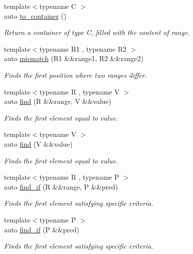 \begin{DoxyCompactItemize}
{\footnotesize template$<$typename C $>$ }\\auto \mbox{\hyperlink{namespacerah_aac33763a1f49060e179c2c2053ec07a2}{to\+\_\+container}} ()
\begin{DoxyCompactList}\small\item\em Return a container of type C, filled with the content of range. \end{DoxyCompactList}\item 
{\footnotesize template$<$typename R1 , typename R2 $>$ }\\auto \mbox{\hyperlink{namespacerah_a5ce2d92c6f0b3dd5eb6d70600e949a97}{mismatch}} (R1 \&\&range1, R2 \&\&range2)
\begin{DoxyCompactList}\small\item\em Finds the first position where two ranges differ. \end{DoxyCompactList}\item 
{\footnotesize template$<$typename R , typename V $>$ }\\auto \mbox{\hyperlink{namespacerah_a7c7d4f08068e85923f475a069c3daeb7}{find}} (R \&\&range, V \&\&value)
\begin{DoxyCompactList}\small\item\em Finds the first element equal to value. \end{DoxyCompactList}\item 
{\footnotesize template$<$typename V $>$ }\\auto \mbox{\hyperlink{namespacerah_a37f60e134164914703fdd0508f83ee11}{find}} (V \&\&value)
\begin{DoxyCompactList}\small\item\em Finds the first element equal to value. \end{DoxyCompactList}\item 
{\footnotesize template$<$typename R , typename P $>$ }\\auto \mbox{\hyperlink{namespacerah_acbd71a185a2510e691dcd715a31edf53}{find\+\_\+if}} (R \&\&range, P \&\&pred)
\begin{DoxyCompactList}\small\item\em Finds the first element satisfying specific criteria. \end{DoxyCompactList}\item 
{\footnotesize template$<$typename P $>$ }\\auto \mbox{\hyperlink{namespacerah_a04200b08ecdef8daf99f04c58f29e459}{find\+\_\+if}} (P \&\&pred)
\begin{DoxyCompactList}\small\item\em Finds the first element satisfying specific criteria. \end{DoxyCompactList}\item 

\end{DoxyCompactItemize}
